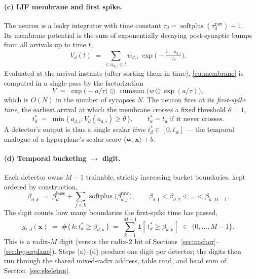 \documentclass[11pt]{article}
\newcommand{\x}{\mathbf{x}}
\newcommand{\w}{\mathbf{w}}
\DeclareMathOperator{\softplus}{softplus}
\DeclareMathOperator{\cumsum}{cumsum}
\newcommand{\ind}[1]{\mathbf{1}\!\left[#1\right]}
\begin{document}
\paragraph{(c) LIF membrane and first spike.} The neuron is a leaky integrator with time constant
$\tau_d = \softplus(\tau^{\mathrm{raw}}_d) + 1$. Its membrane potential is the sum of exponentially decaying
post-synaptic bumps from all arrivals up to time $t$,
\begin{equation}
  V_d(t) \;=\; \sum_{i:\, a_{d,i} \le t} w_{d,i}\,\exp\!\Big(-\tfrac{t - a_{d,i}}{\tau_d}\Big).
  \label{eq:membrane}
\end{equation}
Evaluated at the arrival instants (after sorting them in time), \eqref{eq:membrane} is computed in a single
pass by the factorization
\begin{equation}
  V \;=\; \exp\!\big(-a/\tau\big) \,\odot\, \cumsum\!\big( w \odot \exp(a/\tau) \big),
  \label{eq:cumsum}
\end{equation}
which is $O(N)$ in the number of synapses $N$. The neuron fires at its \emph{first-spike time}, the earliest
arrival at which the membrane crosses a fixed threshold $\theta = 1$,
\begin{equation}
  t^{\ast}_d \;=\; \min\big\{\, a_{d,i} : V_d(a_{d,i}) \ge \theta \,\big\},
  \qquad t^{\ast}_d = t_w \ \text{if it never crosses.}
  \label{eq:firstspike}
\end{equation}
A detector's output is thus a single scalar \emph{time} $t^{\ast}_d \in [0, t_w]$ --- the temporal analogue of
a hyperplane's scalar score $\langle \w, \x\rangle + b$.

\paragraph{(d) Temporal bucketing $\rightarrow$ digit.} Each detector owns $M-1$ trainable, strictly
increasing bucket boundaries, kept ordered by construction,
\begin{equation}
  \beta_{d,k} \;=\; \beta^{\mathrm{base}}_d + \sum_{j \le k} \softplus\!\big(\beta^{\mathrm{raw}}_{d,j}\big),
  \qquad \beta_{d,1} < \beta_{d,2} < \dots < \beta_{d,M-1}.
\end{equation}
The digit counts how many boundaries the first-spike time has passed,
\begin{equation}
  g_{t,d}(\x) \;=\; \#\{\, k : t^{\ast}_d \ge \beta_{d,k} \,\}
             \;=\; \sum_{k=1}^{M-1} \ind{\, t^{\ast}_d \ge \beta_{d,k} \,} \;\in\; \{0,\dots,M-1\}.
  \label{eq:lifdigit}
\end{equation}
This is a radix-$M$ digit (versus the radix-$2$ bit of Sections~\ref{sec:anchor}--\ref{sec:hyperplane}). Steps
(a)--(d) produce one digit per detector; the digits then run through the shared mixed-radix address, table
read, and head sum of Section~\ref{sec:skeleton}.
\end{document}

